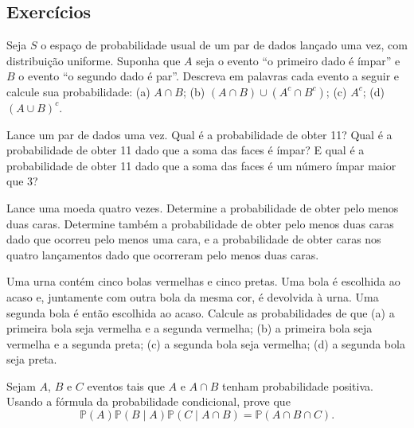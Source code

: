 \subsection{Exercícios}
\label{isaac:sec:exercicios}

\begin{exercise}
\label{isaac:ex:dados-eventos}
Seja $S$ o espaço de probabilidade usual de um par de dados lançado uma vez, com distribuição uniforme. Suponha que $A$ seja o evento ``o primeiro dado é ímpar'' e $B$ o evento ``o segundo dado é par''. Descreva em palavras cada evento a seguir e calcule sua probabilidade: (a) $A\cap B$; (b) $(A\cap B)\cup(A^c\cap B^c)$; (c) $A^c$; (d) $(A\cup B)^c$.
\end{exercise}

\begin{exercise}
\label{isaac:ex:soma-11}
Lance um par de dados uma vez. Qual é a probabilidade de obter 11? Qual é a probabilidade de obter 11 dado que a soma das faces é ímpar? E qual é a probabilidade de obter 11 dado que a soma das faces é um número ímpar maior que 3?
\end{exercise}

\begin{exercise}
\label{isaac:ex:moeda-quatro}
Lance uma moeda quatro vezes. Determine a probabilidade de obter pelo menos duas caras. Determine também a probabilidade de obter pelo menos duas caras dado que ocorreu pelo menos uma cara, e a probabilidade de obter caras nos quatro lançamentos dado que ocorreram pelo menos duas caras.
\end{exercise}

\begin{exercise}
\label{isaac:ex:urna-reposicao}
Uma urna contém cinco bolas vermelhas e cinco pretas. Uma bola é escolhida ao acaso e, juntamente com outra bola da mesma cor, é devolvida à urna. Uma segunda bola é então escolhida ao acaso. Calcule as probabilidades de que (a) a primeira bola seja vermelha e a segunda vermelha; (b) a primeira bola seja vermelha e a segunda preta; (c) a segunda bola seja vermelha; (d) a segunda bola seja preta.
\end{exercise}

\begin{exercise}
\label{isaac:ex:regra-produto}
Sejam $A$, $B$ e $C$ eventos tais que $A$ e $A\cap B$ tenham probabilidade positiva. Usando a fórmula da probabilidade condicional, prove que
\[
\mathbb{P}(A)\mathbb{P}(B\mid A)\mathbb{P}(C\mid A\cap B)
=\mathbb{P}(A\cap B\cap C).
\]
\end{exercise}
